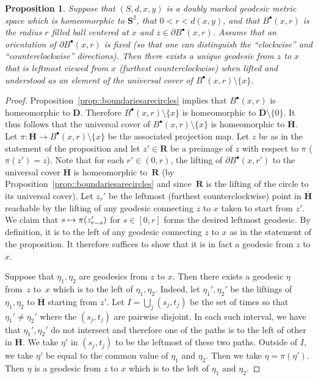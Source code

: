 \documentclass[10pt]{amsart}
\newcommand\mto{\mathchoice{\longmapsto}{\mapsto}{\mapsto}{\mapsto}}
\newcommand{\sbullet}{{\scriptscriptstyle\bullet}}
\theoremstyle{plain}
\numberwithin{theorem}{section}
\newtheorem{proposition}[theorem]{Proposition}
\theoremstyle{definition}
\newcommand{\R}{\mathbf{R}}
\newcommand{\D}{\mathbf{D}}
\renewcommand{\S}{{\mathbf S}}
\newcommand{\h}{\mathbf{H}}
\let\ol\overline
\newcommand{\fb}[2]{B^\sbullet(#1,#2)}
\begin{document}
\begin{proposition}
\label{prop::uniqueleftmost}
Suppose that $(S, d, x,y)$ is a doubly marked geodesic metric space which is homeomorphic to $\S^2$, that $0 < r < d(x,y)$, and that $\fb{x}{r}$ is the radius $r$ filled ball centered at $x$ and $z \in \partial \fb{x}{r}$. Assume that an orientation of $\partial \fb{x}{r}$ is fixed (so that one can distinguish the ``clockwise'' and ``counterclockwise'' directions). Then there exists a unique geodesic from $z$ to $x$ that is \emph{leftmost} viewed from $x$ (\ie furthest counterclockwise) when lifted and understood as an element of the universal cover of $\fb{x}{r} \setminus \{x\}$.
\end{proposition}
\begin{proof}
Proposition~\ref{prop::boundariesarecircles} implies that $\fb{x}{r}$ is homeomorphic to $\ol{\D}$. Therefore $\fb{x}{r} \setminus \{x\}$ is homeomorphic to $\ol{\D} \setminus \{0\}$. It thus follows that the universal cover of $\fb{x}{r} \setminus \{x\}$ is homeomorphic to $\ol{\h}$. Let $\pi \colon \ol{\h} \to \fb{x}{r} \setminus \{x\}$ be the associated projection map. Let $z$ be as in the statement of the proposition and let $z' \in \R$ be a preimage of $z$ with respect to $\pi$ (\ie $\pi(z') = z$). Note that for each $r' \in (0,r)$, the lifting of $\partial \fb{x}{r'}$ to the universal cover $\ol{\h}$ is homeomorphic to~$\R$ (by Proposition~\ref{prop::boundariesarecircles} and since~$\R$ is the lifting of the circle to its universal cover). Let $z_r'$ be the leftmost (\ie furthest counterclockwise) point in $\ol{\h}$ reachable by the lifting of any geodesic connecting $z$ to $x$ taken to start from $z'$. We claim that $s \mto \pi(z_{r-s}')$ for $s \in [0,r]$ forms the desired leftmost geodesic. By definition, it is to the left of any geodesic connecting $z$ to $x$ as in the statement of the proposition. It therefore suffices to show that it is in fact a geodesic from $z$ to $x$.

Suppose that $\eta_1,\eta_2$ are geodesics from $z$ to $x$. Then there exists a geodesic $\eta$ from~$z$ to~$x$ which is to the left of $\eta_1,\eta_2$. Indeed, let $\eta_1',\eta_2'$ be the liftings of $\eta_1,\eta_2$ to $\ol{\h}$ starting from $z'$. Let $I = \bigcup_j (s_j,t_j)$ be the set of times so that $\eta_1' \neq \eta_2'$ where the $(s_j,t_j)$ are pairwise disjoint. In each such interval, we have that $\eta_1',\eta_2'$ do not intersect and therefore one of the paths is to the left of other in $\ol{\h}$. We take $\eta'$ in $(s_j,t_j)$ to be the leftmost of these two paths. Outside of $I$, we take $\eta'$ be equal to the common value of $\eta_1$ and $\eta_2$. Then we take $\eta = \pi(\eta')$. Then $\eta$ is a geodesic from $z$ to $x$ which is to the left of $\eta_1$ and $\eta_2$.


\end{proof}
\end{document}
